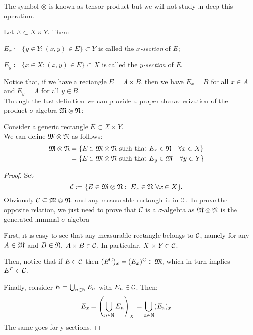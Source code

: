 The symbol $\otimes$ is known as tensor product but we will not study in deep this operation.

\begin{defn}
	Let $E \subset X \times Y$. Then:
	
	$E_x \coloneqq \{y \in Y: (x,y) \in E\} \subset Y$ is called the \emph{$x$-section} of $E$;
	
	$E_y \coloneqq \{x \in X: (x,y) \in E\} \subset X$ is called the \emph{$y$-section} of $E$.
\end{defn}

Notice that, if we have a rectangle $E=A \times B$, then we have $E_x = B$ for all $x \in A$ and  $E_y = A$ for all $y \in B$.\\
Through the last definition we can provide a proper characterization of the product $\sigma$-algebra $\mathfrak M \otimes \mathfrak N$:

\begin{prop} \label{prop-charact-Mg-x-Ng}
	Consider a generic rectangle $E \subset X \times Y$.\\
	We can define $\mathfrak M \otimes \mathfrak N$ as follows:
	\begin{align*}
		\mathfrak M \otimes \mathfrak N
		&=\{E \in \mathfrak M \otimes \mathfrak N \text{ such that } E_x \in \mathfrak N\quad \forall x \in X\} \\
		&=\{E \in \mathfrak M \otimes \mathfrak N \text{ such that }E_y \in \mathfrak M\quad \forall y \in Y\}
	\end{align*}
\end{prop}

\begin{proof}
	Set 
	$$\mathcal C \coloneqq \{E\in \mathfrak M \otimes \mathfrak N :\  E_x \in \mathfrak N \  \forall x \in X\}.$$
	Obviously $\mathcal C \subseteq  \mathfrak M \otimes \mathfrak N$, and any measurable rectangle is in $\mathcal C$. To prove the opposite relation, we just need to prove that $\mathcal C$ is a $\sigma$-algebra as $\mathfrak M \otimes \mathfrak N$ is the generated minimal $\sigma$-algebra.

	First, it is easy to see that any measurable rectangle belongs to $\mathcal C$, namely for any $A \in \mathfrak M$ and $B \in \mathfrak N$, $A \times B \in \mathcal C$. In particular, $X \times Y \in \mathcal C$.
	
	Then, notice that if $E \in \mathcal C$ then $(E^{\mathrm{C}})_x =(E_x)^{\mathrm{C}} \in \mathfrak M$, which in turn implies $E^{\mathrm{C}} \in \mathcal C$.

	Finally, consider $E = \bigcup_{n \in \mathbb N} E_n$ with $E_n \in \mathcal C$. Then:
	$$E_x = \left( \bigcup_{n \in \mathbb N} E_n \right)_{X}
	= \bigcup_{n \in \mathbb N} (E_n)_x$$
	The same goes for y-sections.
\end{proof}

